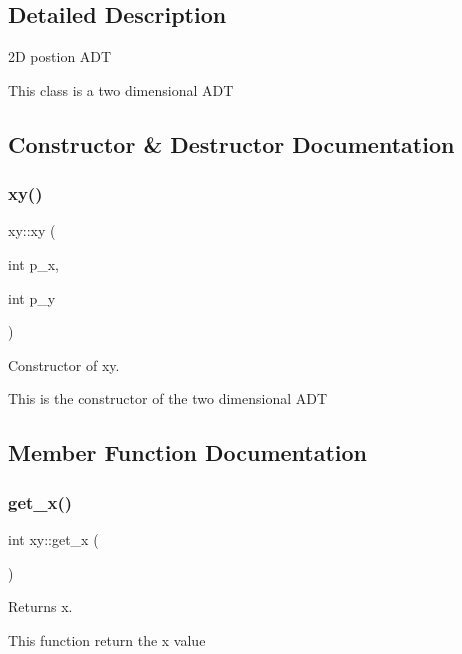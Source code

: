 \subsection{Detailed Description}
2D postion A\+DT 

This class is a two dimensional A\+DT 

\subsection{Constructor \& Destructor Documentation}
\mbox{\label{classxy_ac1690ba262823ec76316338f76c3be50}} 
\subsubsection{\texorpdfstring{xy()}{xy()}}
{\footnotesize\ttfamily xy\+::xy (\begin{DoxyParamCaption}\item[{int}]{p\+\_\+x,  }\item[{int}]{p\+\_\+y }\end{DoxyParamCaption})\hspace{0.3cm}{\ttfamily [inline]}}



Constructor of xy. 

This is the constructor of the two dimensional A\+DT 

\subsection{Member Function Documentation}
\mbox{\label{classxy_aace93cb41e0d6420555d36577390d727}} 
\subsubsection{\texorpdfstring{get\+\_\+x()}{get\_x()}}
{\footnotesize\ttfamily int xy\+::get\+\_\+x (\begin{DoxyParamCaption}{ }\end{DoxyParamCaption})\hspace{0.3cm}{\ttfamily [inline]}}



Returns x. 

This function return the x value \mbox{\label{classxy_a2ae181119299e2a0f2cd012b21eec6d1}} 

